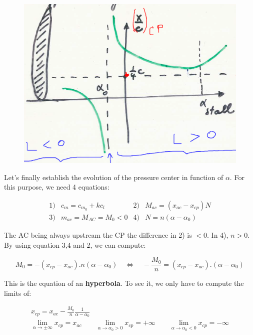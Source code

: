 			\begin{figure}
			\vspace{-5mm}
			\includegraphics[scale=0.3]{ch2/17}
			\end{figure}
			Let's finally establish the evolution of the pressure center in function of $\alpha$. For this purpose, we need 4 equations:
			
			\begin{equation}
			\begin{array}{cccc}
			1) & c_m = c_{m_0} + kc_l & 2)& M_{ac} = (x_{ac}-x_{cp})N \\
			3) & m_{ac} = M_{AC} = M_0 <0 & 4) & N = n(\alpha-\alpha _0)
			\end{array}
			\end{equation}
		
		 	The AC being always upstream the CP the difference in 2) is $<0$. In 4), $n>0$. By using equation 3,4 and 2, we can compute:
		 	
		 	\begin{equation}
		 	M_0 = -(x_{cp}-x_{ac}).n(\alpha - \alpha _0) \quad \Leftrightarrow \quad -\frac{M_0}{n} = (x_{cp}-x_{ac}).(\alpha - \alpha _0)
		 	\end{equation}
		 	
		 	This is the equation of an \textbf{hyperbola}. To see it, we only have to compute the limits of:
		 	
		 	\begin{equation}
		 	\begin{array}{c}
		 	x_{cp} = x_{ac} - \frac{M_0}{n}\frac{1}{\alpha - \alpha _0}\\
		 	\lim _{\alpha \rightarrow \pm\infty} x_{cp} = x_{ac} \qquad \lim _{\alpha \rightarrow \alpha _0 >0} x_{cp} = +\infty \qquad \lim _{\alpha \rightarrow \alpha _0 <0} x_{cp} = -\infty
		 	\end{array}
		 	\end{equation}
		 	
